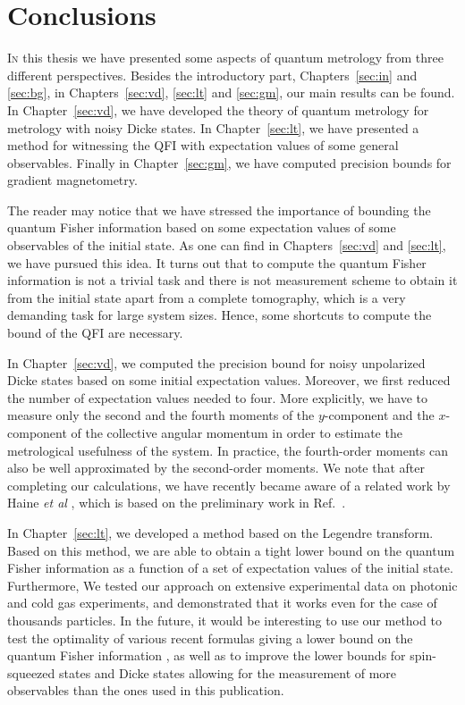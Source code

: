 \section{Conclusions}


\lettrine[lines=2, findent=3pt, nindent=0pt]{I}{n} this thesis we have presented some aspects of quantum metrology from three different perspectives.
Besides the introductory part, Chapters~\ref{sec:in} and \ref{sec:bg}, in Chapters~\ref{sec:vd}, \ref{sec:lt} and \ref{sec:gm}, our main results can be found.
In Chapter~\ref{sec:vd}, we have developed the theory of quantum metrology for metrology with noisy Dicke states.
In Chapter~\ref{sec:lt}, we have presented a method for witnessing the QFI with expectation values of some general observables.
Finally in Chapter~\ref{sec:gm}, we have computed precision bounds for gradient magnetometry.

The reader may notice that we have stressed the importance of bounding the quantum Fisher information based on some expectation values of some observables of the initial state.
As one can find in Chapters~\ref{sec:vd} and \ref{sec:lt}, we have pursued this idea.
It turns out that to compute the quantum Fisher information is not a trivial task and there is not measurement scheme to obtain it from the initial state apart from a complete tomography, which is a very demanding task for large system sizes.
Hence, some shortcuts to compute the bound of the QFI are necessary.

In Chapter~\ref{sec:vd}, we computed the precision bound for noisy unpolarized Dicke states based on some initial expectation values.
Moreover, we first reduced the number of expectation values needed to four.
More explicitly, we have to measure only the second and the fourth moments of the $y$-component and the $x$-component of the collective angular momentum in order to estimate the metrological usefulness of the system.
In practice, the fourth-order moments can also be well approximated by the second-order moments.
We note that after completing our calculations, we have recently became aware of a related work by Haine {\it et al} \cite{Haine2015}, which is based on the preliminary work in Ref.~\cite{Szigeti2014}.

In Chapter~\ref{sec:lt}, we developed a method based on the Legendre transform.
Based on this method, we are able to obtain a tight lower bound on the quantum Fisher information as a function of a set of expectation values of the initial state.
Furthermore, We tested our approach on extensive experimental data on photonic and cold gas experiments, and demonstrated that it works even for the case of thousands particles.
In the future, it would be interesting to use our method to test the optimality of various recent formulas giving a lower bound on the quantum Fisher information \cite{Zhang2014, Oudot2015}, as well as to improve the lower bounds for spin-squeezed states and Dicke states allowing for the measurement of more observables than the ones used in this publication.

